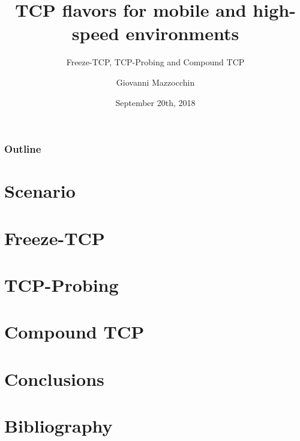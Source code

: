 \documentclass{beamer}
\title{TCP flavors for mobile and high-speed environments}
\subtitle{\newline Freeze-TCP, TCP-Probing and Compound TCP}
\author{Giovanni Mazzocchin}
\date{September 20th, 2018}
\institute{Università degli Studi di Padova}
\begin{document}
\newcommand{\turnOffNumbers}{true} %

\begin{frame}[noframenumbering]
\titlepage
\end{frame}

\let\turnOffNumbers\empty
\begin{frame}
	\frametitle{Outline}
	\tableofcontents
\end{frame}

\section{Scenario}



\section{Freeze-TCP}








\section{TCP-Probing}








\section{Compound TCP}












\section{Conclusions}
%
%

\appendix
\section{Bibliography}

\makethanks
\end{document}
